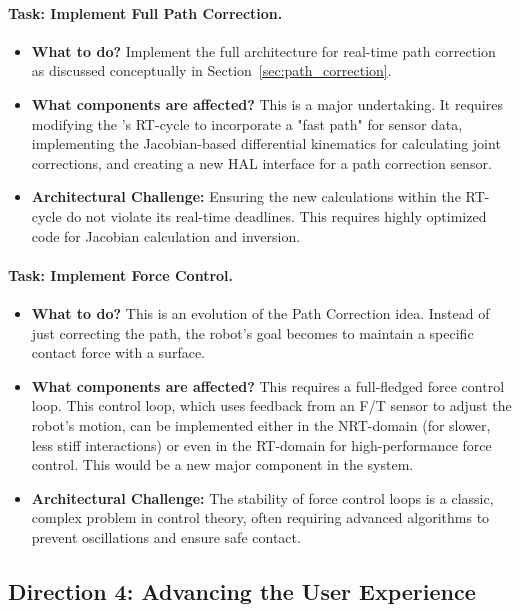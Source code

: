 \paragraph{Task: Implement Full Path Correction.}
\begin{itemize}
    \item \textbf{What to do?} Implement the full architecture for real-time path correction as discussed conceptually in Section~\ref{sec:path_correction}.
    \item \textbf{What components are affected?} This is a major undertaking. It requires modifying the 's RT-cycle to incorporate a "fast path" for sensor data, implementing the Jacobian-based differential kinematics for calculating joint corrections, and creating a new HAL interface for a path correction sensor.
    \item \textbf{Architectural Challenge:} Ensuring the new calculations within the RT-cycle do not violate its real-time deadlines. This requires highly optimized code for Jacobian calculation and inversion.
\end{itemize}

\paragraph{Task: Implement Force Control.}
\begin{itemize}
    \item \textbf{What to do?} This is an evolution of the Path Correction idea. Instead of just correcting the path, the robot's goal becomes to maintain a specific contact force with a surface.
    \item \textbf{What components are affected?} This requires a full-fledged force control loop. This control loop, which uses feedback from an F/T sensor to adjust the robot's motion, can be implemented either in the NRT-domain (for slower, less stiff interactions) or even in the RT-domain for high-performance force control. This would be a new major component in the system.
    \item \textbf{Architectural Challenge:} The stability of force control loops is a classic, complex problem in control theory, often requiring advanced algorithms to prevent oscillations and ensure safe contact.
\end{itemize}

\subsection{Direction 4: Advancing the User Experience}
\label{subsec:dev_path_ux}

